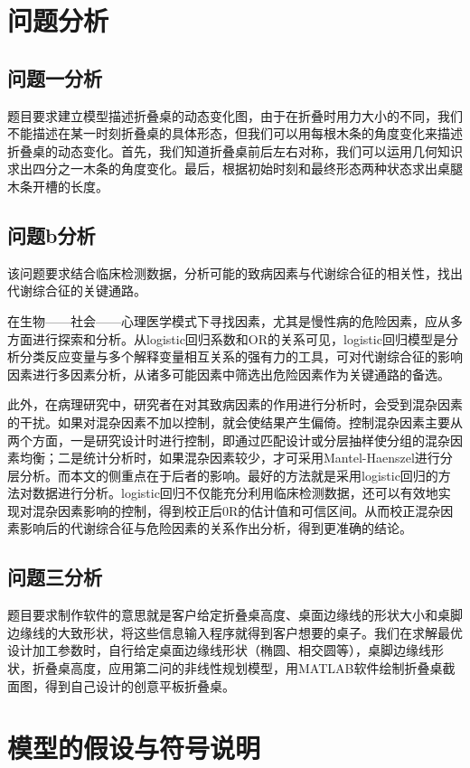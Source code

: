 \documentclass[bwprint]{cumcmthesis}
\begin{document}
\section{问题分析}
\subsection{问题一分析}
题目要求建立模型描述折叠桌的动态变化图，由于在折叠时用力大小的不同，我们不能描述在某一时刻折叠桌的具体形态，但我们可以用每根木条的角度变化来描述折叠桌的动态变化。首先，我们知道折叠桌前后左右对称，我们可以运用几何知识求出四分之一木条的角度变化。最后，根据初始时刻和最终形态两种状态求出桌腿木条开槽的长度。
\subsection{问题b分析}
该问题要求结合临床检测数据，分析可能的致病因素与代谢综合征的相关性，找出代谢综合征的关键通路。

在生物——社会——心理医学模式下寻找因素，尤其是慢性病的危险因素，应从多方面进行探索和分析。从logistic回归系数和OR的关系可见，logistic回归模型是分析分类反应变量与多个解释变量相互关系的强有力的工具，可对代谢综合征的影响因素进行多因素分析，从诸多可能因素中筛选出危险因素作为关键通路的备选。

此外，在病理研究中，研究者在对其致病因素的作用进行分析时，会受到混杂因素的干扰。如果对混杂因素不加以控制，就会使结果产生偏倚。控制混杂因素主要从两个方面，一是研究设计时进行控制，即通过匹配设计或分层抽样使分组的混杂因素均衡；二是统计分析时，如果混杂因素较少，才可采用Mantel-Haenszel进行分层分析。而本文的侧重点在于后者的影响。最好的方法就是采用logistic回归的方法对数据进行分析。logistic回归不仅能充分利用临床检测数据，还可以有效地实现对混杂因素影响的控制，得到校正后0R的估计值和可信区间。从而校正混杂因素影响后的代谢综合征与危险因素的关系作出分析，得到更准确的结论。
\subsection{问题三分析}
题目要求制作软件的意思就是客户给定折叠桌高度、桌面边缘线的形状大小和桌脚边缘线的大致形状，将这些信息输入程序就得到客户想要的桌子。我们在求解最优设计加工参数时，自行给定桌面边缘线形状（椭圆、相交圆等），桌脚边缘线形状，折叠桌高度，应用第二问的非线性规划模型，用MATLAB软件绘制折叠桌截面图，得到自己设计的创意平板折叠桌。

\section{模型的假设与符号说明}
\end{document}
